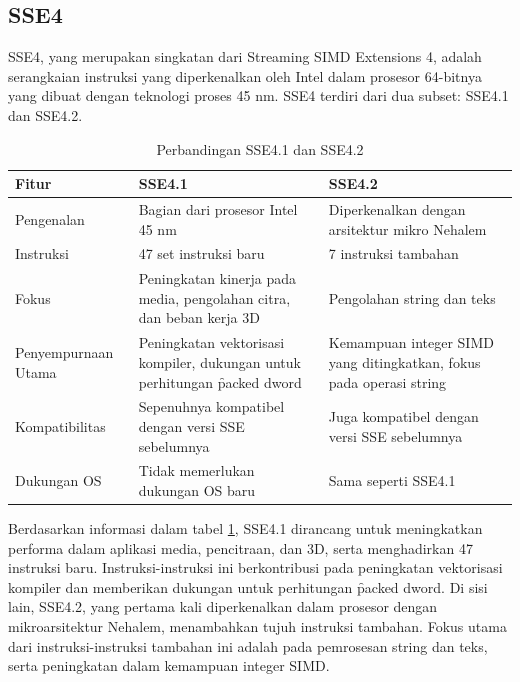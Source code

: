 \subsection{SSE4}
SSE4, yang merupakan singkatan dari Streaming SIMD Extensions 4, adalah serangkaian instruksi yang diperkenalkan oleh Intel dalam prosesor 64-bitnya yang dibuat dengan teknologi proses 45 nm. SSE4 terdiri dari dua subset: SSE4.1 dan SSE4.2\cite{sse4reference}.

\begin{table}[h]
	\centering
	\begin{tabular}{|p{3cm}|p{4.6cm}|p{4.6cm}|}
		\hline
		\textbf{Fitur}      & \textbf{SSE4.1}                                                               & \textbf{SSE4.2}                                                     \\ \hline
		Pengenalan          & Bagian dari prosesor Intel 45 nm                                              & Diperkenalkan dengan arsitektur mikro Nehalem                       \\ \hline
		Instruksi           & 47 set instruksi baru                                                         & 7 instruksi tambahan                                                \\ \hline
		Fokus               & Peningkatan kinerja pada media, pengolahan citra, dan beban kerja 3D          & Pengolahan string dan teks                                          \\ \hline
		Penyempurnaan Utama & Peningkatan vektorisasi kompiler, dukungan untuk perhitungan \f{packed dword} & Kemampuan integer SIMD yang ditingkatkan, fokus pada operasi string \\ \hline
		Kompatibilitas      & Sepenuhnya kompatibel dengan versi SSE sebelumnya                             & Juga kompatibel dengan versi SSE sebelumnya                         \\ \hline
		Dukungan OS         & Tidak memerlukan dukungan OS baru                                             & Sama seperti SSE4.1                                                 \\ \hline
	\end{tabular}
	\caption{Perbandingan SSE4.1 dan SSE4.2}
	\label{table:perbandingan_sse4}
\end{table}

Berdasarkan informasi dalam tabel \ref{table:perbandingan_sse4}, SSE4.1 dirancang untuk meningkatkan performa dalam aplikasi media, pencitraan, dan 3D, serta menghadirkan 47 instruksi baru. Instruksi-instruksi ini berkontribusi pada peningkatan vektorisasi kompiler dan memberikan dukungan untuk perhitungan \f{packed dword}. Di sisi lain, SSE4.2, yang pertama kali diperkenalkan dalam prosesor dengan mikroarsitektur Nehalem, menambahkan tujuh instruksi tambahan. Fokus utama dari instruksi-instruksi tambahan ini adalah pada pemrosesan string dan teks, serta peningkatan dalam kemampuan integer SIMD\cite{sse4reference}.

